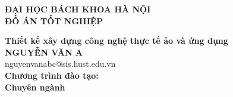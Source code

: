 \documentclass[DoAn.tex]{subfiles}
\begin{document}
\begin{titlepage}
\thispagestyle{empty}
\begin{center}

{\textbf{\large{ĐẠI HỌC BÁCH KHOA HÀ NỘI}}}\\[4cm]

{\textbf{\huge{ ĐỒ ÁN TỐT NGHIỆP}}}\\[1cm]
{\textbf{\Large{Thiết kế xây dựng công nghệ thực tế ảo và ứng dụng}}\\[1cm]

{\textbf{\large{NGUYỄN VĂN A}}}\\
{\large{nguyenvanabc@sis.hust.edu.vn}}\\[0.5cm]

{\textbf{\large{Chương trình đào tạo: \underline{\hspace{3cm}}
}}}\\
{\textbf{\large{Chuyên ngành \underline{\hspace{3cm}}}}}\\ %

\vspace{2cm}
\begin{table}[H]
\centering
{}
\end{table}}
\end{center}



\end{titlepage}
\end{document}
